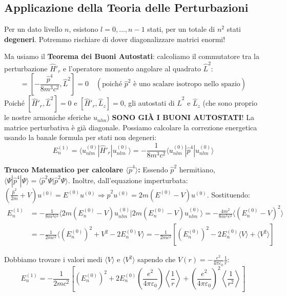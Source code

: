 \documentclass[11pt, a4paper]{article}
\begin{document}
\subsection{Applicazione della Teoria delle Perturbazioni} %

Per un dato livello $n$, esistono $l = 0, \dots, n-1$ stati, per un totale di $n^2$ stati \textbf{degeneri}. Potremmo rischiare di dover diagonalizzare matrici enormi! %

\noindent
Ma usiamo il \textbf{Teorema dei Buoni Autostati}: calcoliamo il commutatore tra la perturbazione $\hat{H}'_r$ e l'operatore momento angolare al quadrato $\hat{L}^2$: %
\begin{equation*}
    [\hat{H}'_r, \hat{L}^2] = \left[ -\frac{\hat{p}^4}{8m^3c^2}, \hat{L}^2 \right] = 0 \quad (\text{poiché } \hat{p}^2 \text{ è uno scalare isotropo nello spazio}) %
\end{equation*}
Poiché $[\hat{H}'_r, \hat{L}^2] = 0$ e $[\hat{H}'_r, \hat{L}_z] = 0$, gli autostati di $\hat{L}^2$ e $\hat{L}_z$ (che sono proprio le nostre armoniche sferiche $u_{nlm}$) \textbf{SONO GIÀ I BUONI AUTOSTATI}! La matrice perturbativa è già diagonale. Possiamo calcolare la correzione energetica usando la banale formula per stati non degeneri: %
\begin{equation*}
    E_n^{(1)} = \langle u_{nlm}^{(0)} | \hat{H}'_r | u_{nlm}^{(0)} \rangle = -\frac{1}{8m^3c^2} \langle u_{nlm}^{(0)} | \hat{p}^4 | u_{nlm}^{(0)} \rangle %
\end{equation*}

\noindent
\textbf{Trucco Matematico per calcolare $\langle \hat{p}^4 \rangle$:} %
Essendo $\hat{p}^2$ hermitiano, $\langle \Psi | \hat{p}^4 | \Psi \rangle = \langle \hat{p}^2 \Psi | \hat{p}^2 \Psi \rangle$. %
Inoltre, dall'equazione imperturbata: $\left( \frac{\hat{p}^2}{2m} + V \right) u^{(0)} = E^{(0)} u^{(0)} \Rightarrow \hat{p}^2 u^{(0)} = 2m(E^{(0)} - V) u^{(0)}$. Sostituendo: %
\begin{align*}
    E_n^{(1)} &= -\frac{1}{8m^3c^2} \langle 2m(E_n^{(0)} - V) u_{nlm}^{(0)} | 2m(E_n^{(0)} - V) u_{nlm}^{(0)} \rangle = -\frac{4m^2}{8m^3c^2} \langle (E_n^{(0)} - V)^2 \rangle \\ %
    &= -\frac{1}{2mc^2} \langle (E_n^{(0)})^2 + V^2 - 2E_n^{(0)}V \rangle = -\frac{1}{2mc^2} \left[ (E_n^{(0)})^2 - 2E_n^{(0)} \langle V \rangle + \langle V^2 \rangle \right] %
\end{align*}

Dobbiamo trovare i valori medi $\langle V \rangle$ e $\langle V^2 \rangle$ sapendo che $V(r) = -\frac{e^2}{4\pi\varepsilon_0} \frac{1}{r}$: %
\begin{equation}
    E_n^{(1)} = -\frac{1}{2mc^2} \left[ (E_n^{(0)})^2 + 2E_n^{(0)} \left( \frac{e^2}{4\pi\varepsilon_0} \right) \left\langle \frac{1}{r} \right\rangle + \left( \frac{e^2}{4\pi\varepsilon_0} \right)^2 \left\langle \frac{1}{r^2} \right\rangle \right] %
\end{equation}
\end{document}
